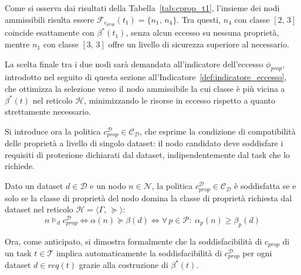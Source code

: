 Come si osserva dai risultati della Tabella~\ref{tab:cprop_t1}, l'insieme dei nodi ammissibili risulta essere $\mathcal{F}_{c_{prop}}(t_1) = \{n_1,\, n_4\}$. Tra questi, $n_4$ con classe $[2,\, 3]$ coincide esattamente con $\beta^*(t_1)$, senza alcun eccesso su nessuna proprietà, mentre $n_1$ con classe $[3,\, 3]$ offre un livello di sicurezza superiore al necessario. 

La scelta finale tra i due nodi sarà demandata all'indicatore dell'eccesso $\phi_{prop}$, introdotto nel seguito di questa sezione all'Indicatore~\ref{def:indicatore_eccesso}, che ottimizza la selezione verso il nodo ammissibile la cui classe è più vicina a $\beta^*(t)$ nel reticolo $\mathcal{H}$, minimizzando le risorse in eccesso rispetto a quanto strettamente necessario.

Si introduce ora la politica $c_{prop}^{\mathcal{D}} \in \mathcal{C_D}$, che esprime la condizione di compatibilità delle proprietà a livello di singolo dataset: il nodo candidato deve soddisfare i requisiti di protezione dichiarati dal dataset, indipendentemente dal task che lo richiede.

\begin{policy}
    \label{pol:cprop_D}
    Dato un dataset $d \in \mathcal{D}$ e un nodo $n \in \mathcal{N}$, la politica $c_{prop}^{\mathcal{D}} \in \mathcal{C_D}$ è soddisfatta se e solo se la classe di proprietà del nodo domina la classe di proprietà richiesta dal dataset nel reticolo $\mathcal{H} = \langle \Gamma,\, \succeq \rangle$:
    \begin{equation}
        n \models_d c_{prop}^{\mathcal{D}}
        \iff
        \alpha(n) \succeq \beta(d)
        \iff
        \forall\, p \in \mathcal{P}:\; \alpha_p(n) \geq \beta_p(d)
    \end{equation}
\end{policy}

Ora, come anticipato, si dimostra formalmente che la soddisfacibilità di $c_{prop}$ di un task $t \in \mathcal{T}$ implica automaticamente la soddisfacibilità di $c_{prop}^{\mathcal{D}}$ per ogni dataset $d \in req(t)$ grazie alla costruzione di $\beta^*(t)$.

